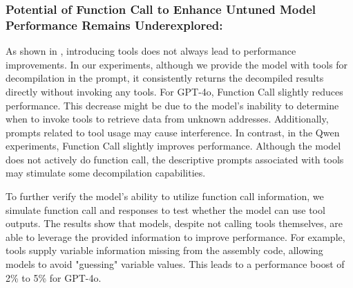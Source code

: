 
\subsubsection{Potential of Function Call to Enhance Untuned Model Performance Remains Underexplored:}
As shown in , introducing tools does not always lead to performance improvements.
In our experiments, although we provide the model with tools for decompilation in the prompt, it consistently returns the decompiled results directly without invoking any tools.
For GPT-4o, Function Call slightly reduces performance. 
This decrease might be due to the model's inability to determine when to invoke tools to retrieve data from unknown addresses.
Additionally, prompts related to tool usage may cause interference.
In contrast, in the Qwen experiments, Function Call slightly improves performance.
Although the model does not actively do function call, the descriptive prompts associated with tools may stimulate some decompilation capabilities. 

To further verify the model's ability to utilize function call information, we simulate function call and responses to test whether the model can use tool outputs. 
The results show that models, despite not calling tools themselves, are able to leverage the provided information to improve performance. 
For example, tools supply variable information missing from the assembly code, allowing models to avoid "guessing" variable values. 
This leads to a performance boost of 2\% to 5\% for GPT-4o.

